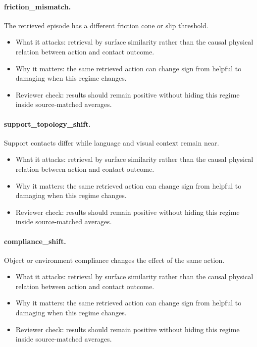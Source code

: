 \documentclass{article}
\begin{document}
\paragraph{friction\_mismatch.} The retrieved episode has a different friction cone or slip threshold.
\begin{itemize}
\item What it attacks: retrieval by surface similarity rather than the causal physical relation between action and contact outcome.
\item Why it matters: the same retrieved action can change sign from helpful to damaging when this regime changes.
\item Reviewer check: results should remain positive without hiding this regime inside source-matched averages.
\end{itemize}
\paragraph{support\_topology\_shift.} Support contacts differ while language and visual context remain near.
\begin{itemize}
\item What it attacks: retrieval by surface similarity rather than the causal physical relation between action and contact outcome.
\item Why it matters: the same retrieved action can change sign from helpful to damaging when this regime changes.
\item Reviewer check: results should remain positive without hiding this regime inside source-matched averages.
\end{itemize}
\paragraph{compliance\_shift.} Object or environment compliance changes the effect of the same action.
\begin{itemize}
\item What it attacks: retrieval by surface similarity rather than the causal physical relation between action and contact outcome.
\item Why it matters: the same retrieved action can change sign from helpful to damaging when this regime changes.
\item Reviewer check: results should remain positive without hiding this regime inside source-matched averages.
\end{itemize}
\end{document}
